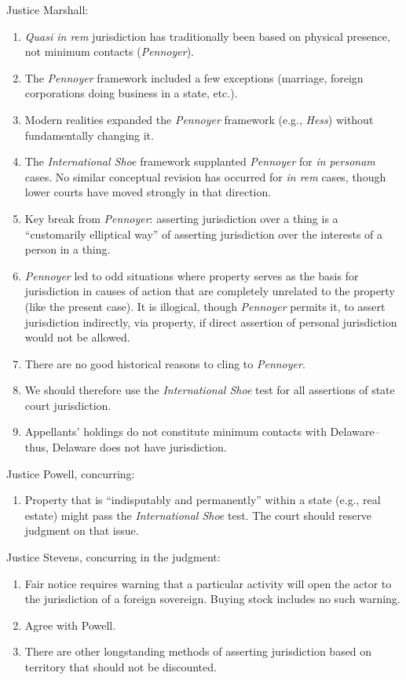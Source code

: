 Justice Marshall:
\begin{enumerate}
\item
  \emph{Quasi in rem} jurisdiction has traditionally been based on
  physical presence, not minimum contacts (\emph{Pennoyer}).
\item
  The \emph{Pennoyer} framework included a few exceptions (marriage,
  foreign corporations doing business in a state, etc.).
\item
  Modern realities expanded the \emph{Pennoyer} framework (e.g.,
  \emph{Hess}) without fundamentally changing it.
\item
  The \emph{International Shoe} framework supplanted \emph{Pennoyer} for
  \emph{in personam} cases. No similar conceptual revision has occurred
  for \emph{in rem} cases, though lower courts have moved strongly in
  that direction.
\item
  Key break from \emph{Pennoyer}: asserting jurisdiction over a thing is
  a ``customarily elliptical way'' of asserting jurisdiction over the
  interests of a person in a thing.
\item
  \emph{Pennoyer} led to odd situations where property serves as the
  basis for jurisdiction in causes of action that are completely
  unrelated to the property (like the present case). It is illogical,
  though \emph{Pennoyer} permits it, to assert jurisdiction indirectly,
  via property, if direct assertion of personal jurisdiction would not
  be allowed.
\item
  There are no good historical reasons to cling to \emph{Pennoyer}.
\item
  We should therefore use the \emph{International Shoe} test for all
  assertions of state court jurisdiction.
\item
  Appellants' holdings do not constitute minimum contacts with
  Delaware--thus, Delaware does not have jurisdiction.
\end{enumerate}

Justice Powell, concurring:

\begin{enumerate}
\item
  Property that is ``indisputably and permanently'' within a state
  (e.g., real estate) might pass the \emph{International Shoe} test. The
  court should reserve judgment on that issue.
\end{enumerate}

Justice Stevens, concurring in the judgment:

\begin{enumerate}
\item
  Fair notice requires warning that a particular activity will open the
  actor to the jurisdiction of a foreign sovereign. Buying stock
  includes no such warning.
\item
  Agree with Powell.
\item
  There are other longstanding methods of asserting jurisdiction based
  on territory that should not be discounted.
\end{enumerate}

